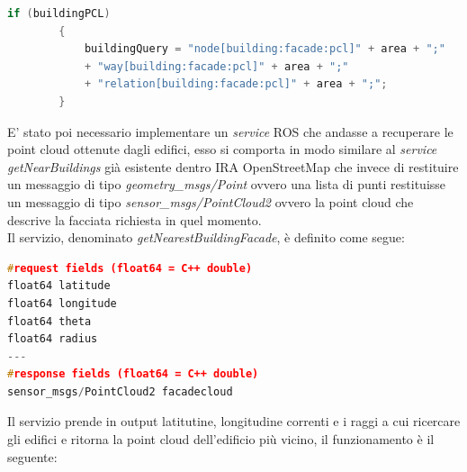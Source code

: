 \begin{lstlisting}[caption={Inserimento della query con cui scaricare gli edifici con la PCL associata.},captionpos=b,language=cpp]
if (buildingPCL)
        {
            buildingQuery = "node[building:facade:pcl]" + area + ";"
            + "way[building:facade:pcl]" + area + ";"
            + "relation[building:facade:pcl]" + area + ";";
        }
\end{lstlisting}

E' stato poi necessario implementare un \textit{service} ROS che andasse a recuperare le point cloud ottenute dagli edifici, esso si comporta in modo similare al \textit{service getNearBuildings} già esistente dentro IRA OpenStreetMap  che invece di restituire un messaggio di tipo 
\textit{geometry\_msgs/Point} ovvero una lista di punti restituisse un messaggio di tipo \textit{sensor\_msgs/PointCloud2} ovvero la point cloud che descrive la facciata richiesta in quel momento.\\

Il servizio, denominato \textit{getNearestBuildingFacade}, è definito come segue:

\begin{lstlisting}[caption={Definizione del servizio per il retrival delle facciate},captionpos=b,language=cpp]
#request fields (float64 = C++ double)
float64 latitude
float64 longitude
float64 theta
float64 radius
---
#response fields (float64 = C++ double)
sensor_msgs/PointCloud2 facadecloud
\end{lstlisting}

Il servizio prende in output latitutine, longitudine correnti e i raggi a cui ricercare gli edifici e ritorna la point cloud dell'edificio più vicino, il funzionamento è il seguente:

